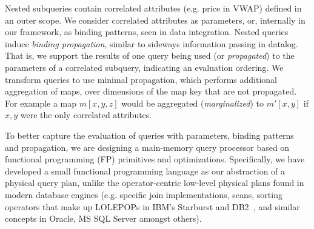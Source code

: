 Nested subqueries contain correlated attributes (e.g. price in VWAP)
defined in an outer scope. We consider correlated attributes as parameters, or,
internally in our framework, as binding patterns, seen in data integration.
Nested queries induce \textit{binding propagation}, similar to sideways
information passing in datalog. That is, we support the results of one query
being used (or \textit{propagated}) to the parameters of a correlated subquery,
indicating an evaluation ordering.
We transform queries to use minimal propagation, which performs additional
aggregation of maps, over dimensions of the map key that are not propagated. For
example a map $m[x,y,z]$ would be aggregated (\textit{marginalized}) to
$m'[x,y]$ if $x,y$ were the only correlated attributes.





To better capture the evaluation of queries with parameters, binding patterns
and propagation, we are designing a main-memory query processor based
on functional programming (FP) primitives and optimizations. Specifically, we
have developed a small functional programming language as our abstraction of a
physical query plan, unlike the operator-centric low-level physical plans found
in modern database engines (e.g. specific join implementations, scans, sorting
operators that make up LOLEPOPs in IBM's Starburst and
DB2~\cite{mcpherson-debull:87}, and similar concepts in Oracle, MS SQL
Server amongst others).

